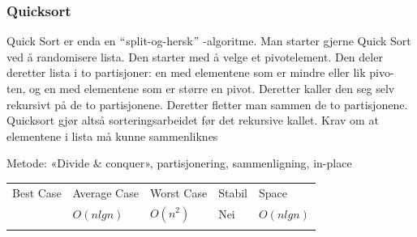 \documentclass[12pt]{report}
\begin{document}
\setlength{\parskip}{6.0pt}

\vspace{\baselineskip}\subsubsection*{Quicksort}
\setlength{\parskip}{10.56pt}
Quick Sort er enda en $``$split-og-hersk$"$ -algoritme. Man starter gjerne Quick Sort ved å randomisere lista. Den starter med å velge et pivotelement. Den deler deretter lista i to partisjoner: en med elementene som er mindre eller lik pivo- ten, og en med elementene som er større en pivot. Deretter kaller den seg selv rekursivt på de to partisjonene. Deretter fletter man sammen de to partisjonene. Quicksort gjør altså sorteringsarbeidet før det rekursive kallet. Krav om at elementene i lista må kunne sammenliknes\par

Metode: «Divide $\&$  conquer», partisjonering, sammenligning, in-place\par





\begin{table}[H]
 			\centering
\begin{tabular}{p{1.13in}p{1.59in}p{1.34in}p{0.69in}p{0.91in}}
\hline
\multicolumn{1}{p{1.13in}}{{\fontsize{13pt}{15.6pt}\selectfont Best Case}} & 
\multicolumn{1}{p{1.59in}}{{\fontsize{13pt}{15.6pt}\selectfont Average Case}} & 
\multicolumn{1}{p{1.34in}}{{\fontsize{13pt}{15.6pt}\selectfont Worst Case}} & 
\multicolumn{1}{p{0.69in}}{{\fontsize{13pt}{15.6pt}\selectfont Stabil}} & 
\multicolumn{1}{p{0.91in}}{{\fontsize{13pt}{15.6pt}\selectfont Space}} \\
\hhline{-----}
\multicolumn{1}{p{1.13in}}{ \( O \left( n lgn \right)  \) } & 
\multicolumn{1}{p{1.59in}}{ \( O \left( n lgn \right)  \) } & 
\multicolumn{1}{p{1.34in}}{ \( O \left( n^{2} \right)  \) } & 
\multicolumn{1}{p{0.69in}}{{\fontsize{13pt}{15.6pt}\selectfont Nei}} & 
\multicolumn{1}{p{0.91in}}{ \( O \left( n lgn \right)  \) } \\
\hhline{-----}

\end{tabular}
 \end{table}


\end{document}
